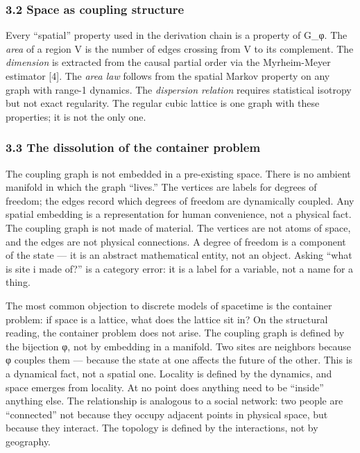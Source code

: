 \documentclass[
  11pt,
]{article}
\begin{document}
\hypertarget{space-as-coupling-structure}{%
\subsubsection{3.2 Space as coupling
structure}\label{space-as-coupling-structure}}

Every ``spatial'' property used in the derivation chain is a property of
G\_φ. The \emph{area} of a region V is the number of edges crossing from
V to its complement. The \emph{dimension} is extracted from the causal
partial order via the Myrheim-Meyer estimator {[}4{]}. The \emph{area
law} follows from the spatial Markov property on any graph with range-1
dynamics. The \emph{dispersion relation} requires statistical isotropy
but not exact regularity. The regular cubic lattice is one graph with
these properties; it is not the only one.

\hypertarget{the-dissolution-of-the-container-problem}{%
\subsubsection{3.3 The dissolution of the container
problem}\label{the-dissolution-of-the-container-problem}}

The coupling graph is not embedded in a pre-existing space. There is no
ambient manifold in which the graph ``lives.'' The vertices are labels
for degrees of freedom; the edges record which degrees of freedom are
dynamically coupled. Any spatial embedding is a representation for human
convenience, not a physical fact. The coupling graph is not made of
material. The vertices are not atoms of space, and the edges are not
physical connections. A degree of freedom is a component of the state
--- it is an abstract mathematical entity, not an object. Asking ``what
is site i made of?'' is a category error: it is a label for a variable,
not a name for a thing.

The most common objection to discrete models of spacetime is the
container problem: if space is a lattice, what does the lattice sit in?
On the structural reading, the container problem does not arise. The
coupling graph is defined by the bijection φ, not by embedding in a
manifold. Two sites are neighbors because φ couples them --- because the
state at one affects the future of the other. This is a dynamical fact,
not a spatial one. Locality is defined by the dynamics, and space
emerges from locality. At no point does anything need to be ``inside''
anything else. The relationship is analogous to a social network: two
people are ``connected'' not because they occupy adjacent points in
physical space, but because they interact. The topology is defined by
the interactions, not by geography.
\end{document}
